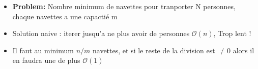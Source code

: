 \begin{frame}
    \frametitle{\problemtitle}
    \begin{itemize}
        \item<+-> \textbf{Problem:} Nombre minimum de navettes pour tranporter N personnes, chaque navettes a une capactié m
        \item Solution naive : iterer jusqu'a ne plus avoir de personnes $\mathcal O(n)$, Trop lent !
        \item<+->  Il faut au minimum $n / m$ navettes, et si le reste de la division est $\ne 0$ alors il en faudra une de plus $\mathcal O(1)$
    \end{itemize}
\end{frame}
